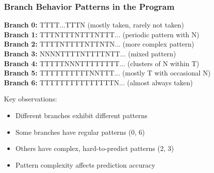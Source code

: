 \documentclass[aspectratio=169,12pt]{beamer}
\begin{document}
\begin{frame}
  \frametitle{Branch Behavior Patterns in the Program}
  
  \scriptsize
  
  \begin{tcolorbox}[colback=gray!5, colframe=gray!50]
    \textbf{Branch 0:} TTTT...TTTN (mostly taken, rarely not taken) \\
    \vspace{0.2em}
    \textbf{Branch 1:} TTTNTTTNTTTNTTT... (periodic pattern with N)\\
    \vspace{0.2em}
    \textbf{Branch 2:} TTTTNTTTTNTTNTN... (more complex pattern)\\
    \vspace{0.2em}
    \textbf{Branch 3:} NNNNTTTTNTTTTNTT... (mixed pattern)\\
    \vspace{0.2em}
    \textbf{Branch 4:} TTTTTNNNTTTTTTTT... (clusters of N within T)\\
    \vspace{0.2em}
    \textbf{Branch 5:} TTTTTTTTTTNNTTT... (mostly T with occasional N)\\
    \vspace{0.2em}
    \textbf{Branch 6:} TTTTTTTTTTTTTTTN... (almost always taken)
  \end{tcolorbox}
  
  \normalsize
  \vspace{0.5em}
  Key observations:
  \begin{itemize}
    \item Different branches exhibit different patterns
    \item Some branches have regular patterns (0, 6)
    \item Others have complex, hard-to-predict patterns (2, 3)
    \item Pattern complexity affects prediction accuracy
  \end{itemize}
\end{frame}
\end{document}
